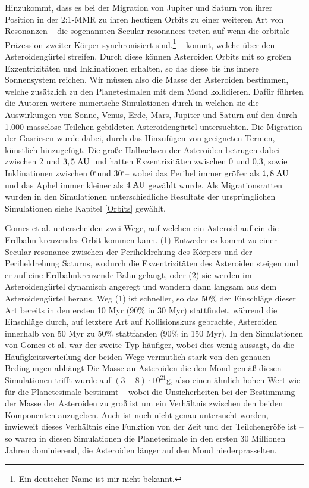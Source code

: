 \documentclass[10pt,a4paper,twoside]{article}
\newcommand{\refsec}[1]{siehe Kapitel \ref{#1}}
\newcommand{\degree}{$^\circ$}
\begin{document}
Hinzukommt, dass es bei der Migration von Jupiter und Saturn von ihrer Position in der 2:1-MMR zu ihren heutigen Orbits zu einer weiteren Art von Resonanzen – die sogenannten Secular resonances treten auf wenn die orbitale Präzession zweiter Körper synchronisiert sind.\footnote{Ein deutscher Name ist mir nicht bekannt.} – %
kommt, welche über den Asteroidengürtel streifen. %
Durch diese können Asteroiden Orbits mit so großen Exzentrizitäten und Inklinationen erhalten, so das diese bis ins innere Sonnensystem reichen. Wir müssen also die Masse der Asteroiden bestimmen, welche zusätzlich zu den Planetesimalen %
mit dem Mond kollidieren.
Dafür führten die Autoren weitere numerische Simulationen durch in welchen sie die Auswirkungen von Sonne, Venus, Erde, Mars, Jupiter und Saturn auf den durch 1.000 masselose Teilchen gebildeten Asteroidengürtel untersuchten.
Die Migration der Gasriesen wurde dabei, durch das Hinzufügen von geeigneten Termen, künstlich hinzugefügt. %
Die große Halbachsen der Asteroiden betrugen dabei zwischen $2$ und $3,5 \;\mathrm{AU}$ und hatten Exzentrizitäten zwischen 0 und 0,3, sowie Inklinationen zwischen 0\degree und 30\degree – wobei das Perihel immer größer als $1,8 \;\mathrm{AU}$ und das Aphel immer kleiner als $4 \;\mathrm{AU}$ gewählt wurde. %
Als Migrationsratten wurden in den Simulationen unterschiedliche Resultate der ursprünglichen Simulationen \refsec{Orbits} gewählt. %

Gomes et al.\cite{Gomes2005} unterscheiden zwei Wege, auf welchen ein Asteroid auf ein die Erdbahn kreuzendes Orbit kommen kann. (1) Entweder es kommt zu einer Secular resonance zwischen der Periheldrehung des Körpers und der Periheldrehung Saturns, wodurch die Exzentrizitäten des Asteroiden steigen und er auf eine Erdbahnkreuzende Bahn gelangt, oder (2) sie werden im Asteroidengürtel dynamisch angeregt und wandern dann langsam aus dem Asteroidengürtel heraus\cite{Gomes2005}.
Weg (1) ist schneller, so das 50\% der Einschläge dieser Art bereits in den ersten 10 Myr (90\% in 30 Myr) stattfindet, während die Einschläge durch, auf letztere Art auf Kollisionskurs gebrachte, Asteroiden innerhalb von 50 Myr zu 50\% stattfanden (90\% in 150 Myr)\cite{Gomes2005}.
In den Simulationen von Gomes et al. war der zweite Typ häufiger, wobei dies wenig aussagt, da
die Häufigkeitsverteilung der beiden Wege vermutlich stark von den genauen Bedingungen abhängt\cite{Gomes2005} %
Die Masse an Asteroiden die den Mond gemäß diesen Simulationen trifft wurde auf $\left( 3-8 \right) \cdot 10^{21} \mathrm{g}$, %
also einen ähnlich hohen Wert wie für die Planetesimale bestimmt – wobei die Unsicherheiten bei der Bestimmung der Masse der Asteroiden zu groß ist um ein Verhältnis zwischen den beiden Komponenten anzugeben. Auch ist noch nicht genau untersucht worden, inwieweit dieses Verhältnis eine Funktion von der Zeit und der Teilchengröße ist – so waren in diesen Simulationen die Planetesimale in den ersten 30 Millionen Jahren dominierend, die Asteroiden länger auf den Mond niederprasselten\cite{Gomes2005}.
\end{document}
